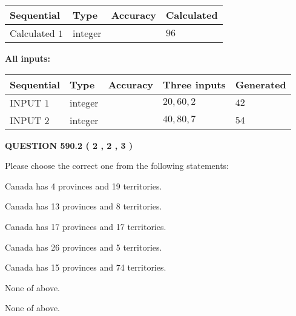 \documentclass[12pt]{article}
\begin{document}
   
  
  
\noindent\begin{tabular}{|l|l|l|l|}
\hline
 Sequential & Type & Accuracy & Calculated \\ 
\hline
 
 
  Calculated $  1 $ & integer &  & 
  $ 96 $ 
 \\  \hline  
 \end{tabular}
   
   
   
   
\noindent\vspace{0.1in}\hspace{-0.08in} {\textbf{\Large{All inputs: }}}
   
   
  
  
\noindent\begin{tabular}{|l|l|l|l|l|}
\hline
 Sequential & Type & Accuracy & Three inputs & Generated \\ 
\hline
 
 
  INPUT $  1 $ & integer &  & $
 20
 , 
 60
 , 
 2
 $ & $ 42 $ 
 \\  \hline  
 
 
  INPUT $  2 $ & integer &  & $
 40
 , 
 80
 , 
 7
 $ & $ 54 $ 
 \\  \hline  
 \end{tabular}
   
   
  
\vspace{0.2in}
  
{\textbf{\Large{QUESTION
590.2 
 ( 2 , 2 , 3 )
}}}
  
  
Please choose the correct one from the following statements:
 
 
Canada has   4 provinces and  19 territories.
 
 
Canada has  13 provinces and  8 territories.
 
 
Canada has  17 provinces and  17 territories.
 
 
Canada has  26 provinces and  5 territories.
 
 
Canada has  15 provinces and  74 territories.
 
 
 None of above.
 
 
\noindent{}
 
 
 None of above.
 
\end{document}
